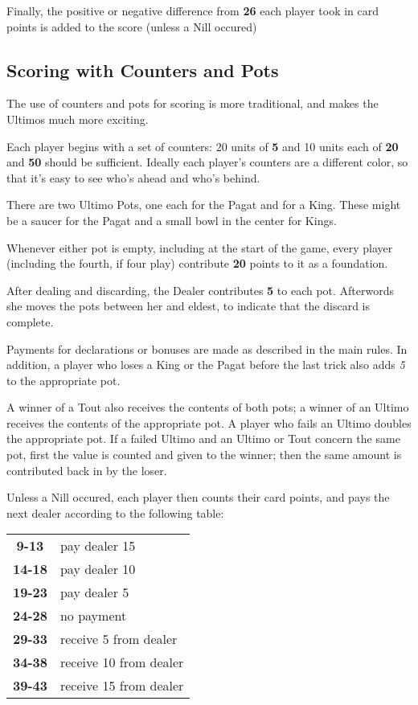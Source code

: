 \documentclass[ebook,12pt,twoside,openright,extrafontsizes,final]{memoir}
\begin{document}
Finally, the positive or negative difference from \textbf{26} each player took in card
points is added to the score (unless a Nill occured)

\subsection{Scoring with Counters and Pots}
The use of counters and pots for scoring is more traditional, and makes the Ultimos much
more exciting.

Each player begins with a set of counters: 20 units of \textbf{5} and 10 units each of 
\textbf{20} and \textbf{50} should be sufficient. Ideally each player’s counters are 
a different color, so that it's easy to see who’s ahead and who’s behind.

There are two Ultimo Pots, one each for the Pagat and for a King. These might be a saucer
for the Pagat and a small bowl in the center for Kings.

Whenever either pot is empty, including at the start of the game, every player (including
the fourth, if four play) contribute \textbf{20} points to it as a foundation.

After dealing and discarding, the Dealer contributes \textbf{5} to each pot. Afterwords she
moves the pots between her and eldest, to indicate that the discard is complete.

Payments for declarations or bonuses are made as described in the main rules. In addition,
a player who loses a King or the Pagat before the last trick also adds \textit{5} to the
appropriate pot. 

A winner of a Tout also receives the contents of both pots; a winner of an Ultimo receives
the contents of the appropriate pot.  A player who fails an Ultimo doubles the appropriate
pot.  If a failed Ultimo and an Ultimo or Tout concern the same pot, first the value is
counted and given to the winner; then the same amount is contributed back in by the loser.

Unless a Nill occured, each player then counts their card points, and pays the next dealer
according to the following table:

\begin{center}
\begin{tabular}{cl}
\textbf{9-13}  & pay dealer 15\\
\textbf{14-18} & pay dealer 10\\
\textbf{19-23} & pay dealer 5 \\
\textbf{24-28} & no payment\\
\textbf{29-33} & receive 5 from dealer\\
\textbf{34-38} & receive 10 from dealer\\
\textbf{39-43} & receive 15 from dealer
\end{tabular}
\end{center}
\end{document}
